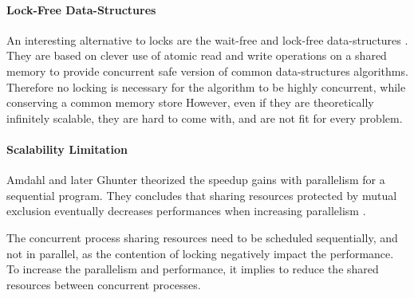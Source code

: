 \paragraph{Lock-Free Data-Structures}

An interesting alternative to locks are the wait-free and lock-free data-structures \cite{Lamport1977,Herlihy1988,Herlihy1990,Herlihy1991,Anderson1990}.
They are based on clever use of atomic read and write operations on a shared memory to provide concurrent safe version of common data-structures algorithms.
Therefore no locking is necessary for the algorithm to be highly concurrent, while conserving a common memory store
However, even if they are theoretically infinitely scalable, they are hard to come with, and are not fit for every problem.



\paragraph{Scalability Limitation}

Amdahl \cite{Amdahl1967} and later Ghunter \cite{Gunther1993} theorized the speedup gains with parallelism for a sequential program.
They concludes that sharing resources protected by mutual exclusion eventually decreases performances when increasing parallelism \cite{Gustafson1988,Gunther1996,Nelson1996,Gunther2002}.

The concurrent process sharing resources need to be scheduled sequentially, and not in parallel, as the contention of locking negatively impact the performance.
To increase the parallelism and performance, it implies to reduce the shared resources between concurrent processes.


